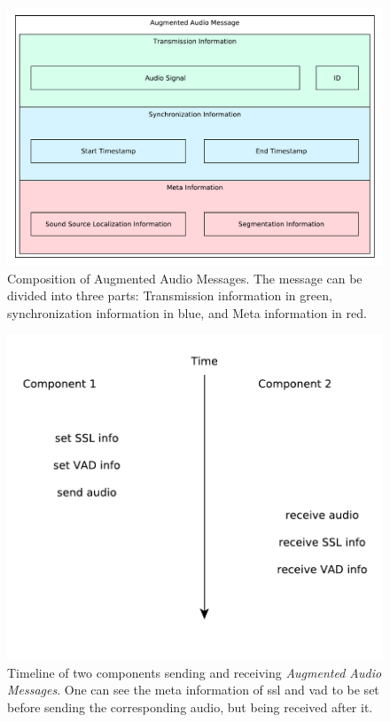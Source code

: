 \begin{figure}[]
	\centering
	\includegraphics[width=\textwidth]{bilder/rosmsg/augmented_audio.pdf}
	\caption{Composition of Augmented Audio Messages.
		The message can be divided into three parts:
		Transmission information in green, synchronization information in blue, and Meta information in red.}
	\label{pic:main:lib:augmented_audio}
\end{figure}

\begin{figure}[]
	\centering
	\includegraphics[width=\textwidth]{diagrams/lib_ssl_vad_time.pdf}
	\caption{Timeline of two components sending and receiving \textit{Augmented Audio Messages}.
		One can see the meta information of \gls{ssl} and \gls{vad} to be set before sending the corresponding audio, but being received after it.}
	\label{pic:main:lib:ssl_vad_time}
\end{figure}

